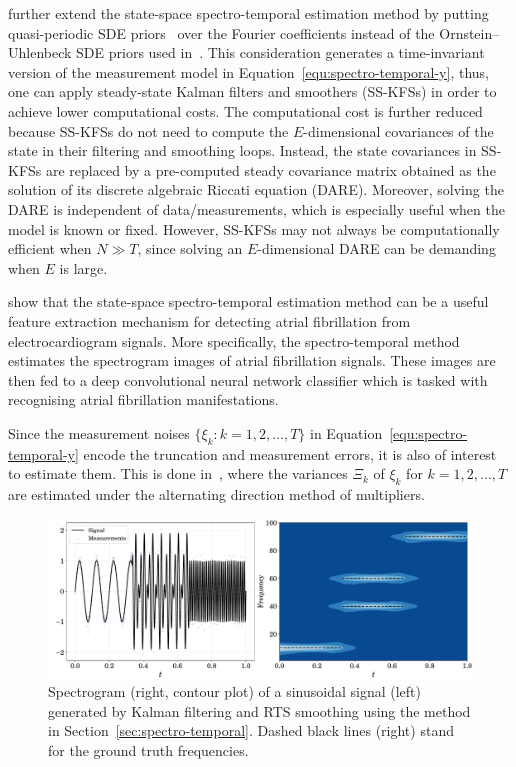 \citet{ZhaoZheng2020KFECG} further extend the state-space spectro-temporal estimation method by putting quasi-periodic SDE priors~\citep{Solin2014} over the Fourier coefficients instead of the Ornstein--Uhlenbeck SDE priors used in~\citet{ZhaoZheng2018KF}. This consideration generates a time-invariant version of the measurement model in Equation~\eqref{equ:spectro-temporal-y}, thus, one can apply steady-state Kalman filters and smoothers (SS-KFSs) in order to achieve lower computational costs. The computational cost is further reduced because SS-KFSs do not need to compute the $E$-dimensional covariances of the state in their filtering and smoothing loops. Instead, the state covariances in SS-KFSs are replaced by a pre-computed steady covariance matrix obtained as the solution of its discrete algebraic Riccati equation (DARE). Moreover, solving the DARE is independent of data/measurements, which is especially useful when the model is known or fixed. However, SS-KFSs may not always be computationally efficient when $N \gg T$, since solving an $E$-dimensional DARE can be demanding when $E$ is large.

\citet{ZhaoZheng2018KF, ZhaoZheng2020KFECG} show that the state-space spectro-temporal estimation method can be a useful feature extraction mechanism for detecting atrial fibrillation from electrocardiogram signals. More specifically, the spectro-temporal method estimates the spectrogram images of atrial fibrillation signals. These images are then fed to a deep convolutional neural network classifier which is tasked with recognising atrial fibrillation manifestations.

Since the measurement noises $\lbrace \xi_k\colon k=1,2,\ldots,T \rbrace$ in Equation~\eqref{equ:spectro-temporal-y} encode the truncation and measurement errors, it is also of interest to estimate them. This is done in~\citet{GaoRui2019ALKS}, where the variances $\Xi_k$ of $\xi_k$ for $k=1,2,\ldots, T$ are estimated under the alternating direction method of multipliers.

\begin{figure}[t!]
	\centering
	\includegraphics[width=.99\linewidth]{figs/spectro-temporal-demo1}
	\caption{Spectrogram (right, contour plot) of a sinusoidal signal (left) generated by Kalman filtering and RTS smoothing using the method in Section~\ref{sec:spectro-temporal}. Dashed black lines (right) stand for the ground truth frequencies.}
	\label{fig:spectro-temporal-demo}
\end{figure}

